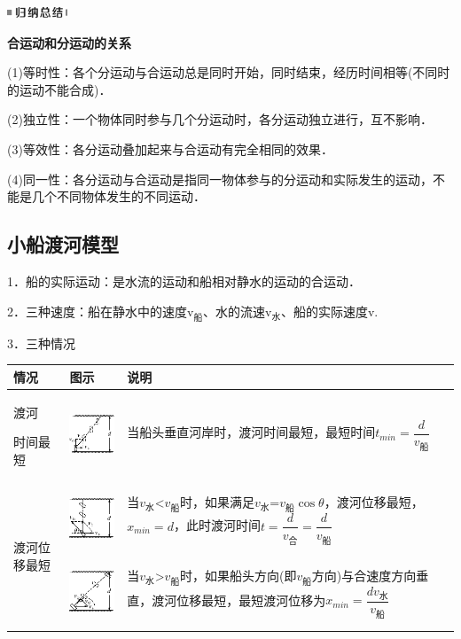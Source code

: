 \begin{center}\includegraphics[width=0.70833in,height=0.125in]{media/image13.png}

\textbf{合运动和分运动的关系}
\end{center}


(1)等时性：各个分运动与合运动总是同时开始，同时结束，经历时间相等(不同时的运动不能合成)．

(2)独立性：一个物体同时参与几个分运动时，各分运动独立进行，互不影响．

(3)等效性：各分运动叠加起来与合运动有完全相同的效果．

(4)同一性：各分运动与合运动是指同一物体参与的分运动和实际发生的运动，不能是几个不同物体发生的不同运动．


\newpage
\subsection{小船渡河模型}

1．船的实际运动：是水流的运动和船相对静水的运动的合运动．

2．三种速度：船在静水中的速度$\mathrm v_{\text{船}}$、水的流速$\mathrm v_{\text{水}}$、船的实际速度v.

3．三种情况

\begin{longtable}[]{@{}m{0.8cm}m{2.5cm}m{10cm}@{}}
\toprule
情况 & 图示 & 说明\tabularnewline
\midrule
\endhead

渡河

时间最短
&
\includegraphics[width=0.90625in,height=0.76042in]{media/image146.png}
&
当船头垂直河岸时，渡河时间最短，最短时间$t_{min}=\dfrac{d}{v_{\text{船}}}$
\tabularnewline
\multirow{2}{0.8cm}{渡河位移最短}
&
\includegraphics[width=0.85417in,height=0.76042in]{media/image147.png}
&
当$v_{\text{水}}$\textless $v_{\text{船}}$时，如果满足$v_{\text{水}}$=$v_{\text{船}}\cos
\theta$，渡河位移最短，$x_{min}=d$，此时渡河时间$t=\dfrac{d}{v_{\text{合}}}=\dfrac{d}{v_{\text{船}}}$
\tabularnewline
&
\includegraphics[width=0.85417in,height=0.76042in]{media/image148.png}
&
当$v_{\text{水}}$\textgreater $v_{\text{船}}$时，如果船头方向(即$v_{\text{船}}$方向)与合速度方向垂直，渡河位移最短，最短渡河位移为$x_{min}=\dfrac{dv_{\text{水}}}{v_{\text{船}}}$\tabularnewline
\bottomrule
\end{longtable}

